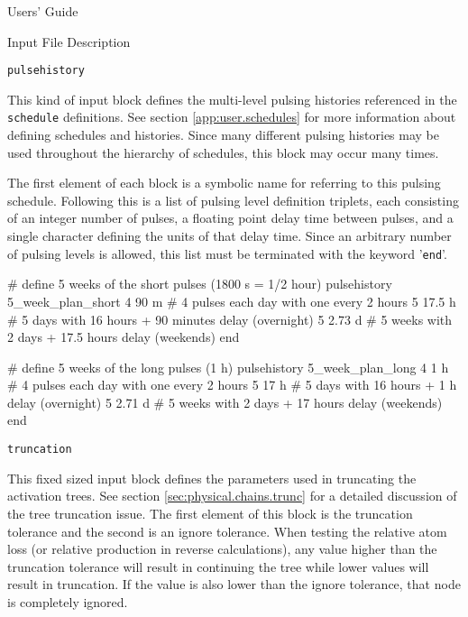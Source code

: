 \begin{chapter}{Users' Guide\label{app:user.guide}}
\begin{section}{Input File Description\label{app:user.input}}
    \begin{subsection}{\texttt{pulsehistory}\label{app:user.input.pulse}}
      
      This kind of input block defines the multi-level pulsing
      histories referenced in the \texttt{schedule} definitions.  See
      section \ref{app:user.schedules} for more information about
      defining schedules and histories.  Since many different pulsing
      histories may be used throughout the hierarchy of schedules,
      this block may occur many times.

      The first element of each block is a symbolic name for referring
      to this pulsing schedule.  Following this is a list of pulsing
      level definition triplets, each consisting of an integer number
      of pulses, a floating point delay time between pulses, and a
      single character defining the units of that delay time.  Since
      an arbitrary number of pulsing levels is allowed, this list must
      be terminated with the keyword '\texttt{end}'.

      \begin{center}
        \renewcommand{\baselinestretch}{1}\normalsize
        \begin{boxedverbatim}
# define 5 weeks of the short pulses (1800 s = 1/2 hour)
pulsehistory 5_week_plan_short
   4  90 m   # 4 pulses each day with one every 2 hours
   5  17.5 h # 5 days with 16 hours + 90 minutes delay (overnight)
   5  2.73 d # 5 weeks with 2 days + 17.5 hours delay (weekends)
end

# define 5 weeks of the long pulses (1 h)
pulsehistory 5_week_plan_long
   4  1 h    # 4 pulses each day with one every 2 hours
   5  17 h   # 5 days with 16 hours + 1 h delay (overnight)
   5  2.71 d # 5 weeks with 2 days + 17 hours delay (weekends)
end
\end{boxedverbatim}
      \end{center}

    \end{subsection}

    \begin{subsection}{\texttt{truncation}\label{app:user.input.trunc}}
      
      This fixed sized input block defines the parameters used in
      truncating the activation trees.  See section
      \ref{sec:physical.chains.trunc} for a detailed discussion of the
      tree truncation issue.  The first element of this block is the
      truncation tolerance and the second is an ignore tolerance.
      When testing the relative atom loss (or relative production in
      reverse calculations), any value higher than the truncation
      tolerance will result in continuing the tree while lower values
      will result in truncation.  If the value is also lower than the
      ignore tolerance, that node is completely ignored.


\end{subsection}
\end{section}
\end{chapter}

